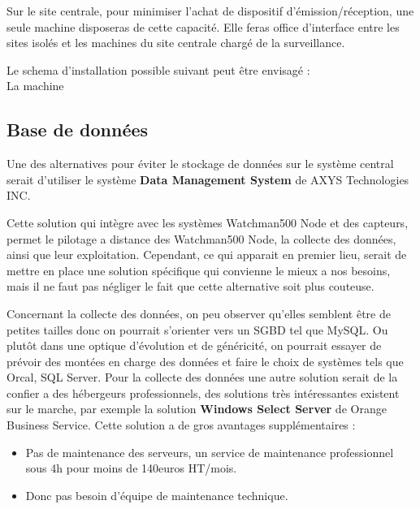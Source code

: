         Sur le site centrale, pour minimiser l'achat de dispositif d'émission/réception, une seule machine disposeras de cette capacité.
        Elle feras office d'interface entre les sites isolés et les machines du site centrale chargé de la surveillance.
        
        Le schema d'installation possible suivant peut être envisagé :\\
            La machine 
            
        

    \subsection{Base de données}

		Une des alternatives pour éviter le stockage de données sur le système central serait d'utiliser le système \textbf{Data Management System} de AXYS Technologies INC.


        {Cette solution qui intègre avec les systèmes Watchman500 Node et des capteurs, permet le pilotage a distance des Watchman500 Node, la collecte des données, ainsi que leur exploitation.}
        {}
        {}
        {}
        {}
        {Cependant, ce qui apparait en premier lieu, serait de mettre en place une solution spécifique qui convienne le mieux a nos besoins, mais il ne faut pas négliger le fait que cette alternative soit plus couteuse.}

		        Concernant la collecte des données, on peu observer qu'elles semblent être de petites tailles donc on pourrait s'orienter vers un SGBD tel que MySQL. Ou plutôt dans une optique d'évolution et de généricité, on pourrait essayer de prévoir des montées en charge des données et faire le choix de systèmes tels que Orcal, SQL Server.
		        Pour la collecte des données une autre solution serait de la confier a des hébergeurs professionnels, des solutions très intéressantes existent sur le marche, par exemple la solution \textbf{Windows Select Server} de Orange Business Service. Cette solution a de gros avantages supplémentaires :
		        \begin{itemize}
				        \item Pas de maintenance des serveurs, un service de maintenance professionnel sous 4h pour moins de 140euros HT/mois.
				        \item Donc pas besoin d'équipe de maintenance technique.
		        \end{itemize}

